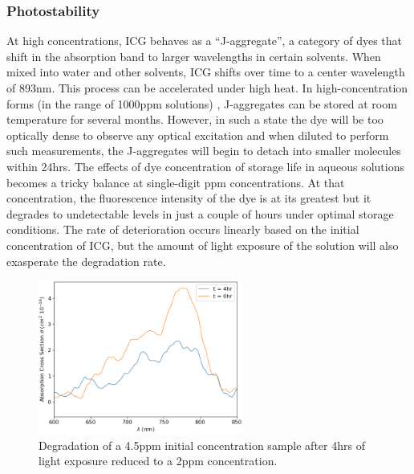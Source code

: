 \subsubsection{ Photostability}
At high concentrations, ICG behaves as a  ``J-aggregate'', a category of dyes that shift in the absorption band to larger wavelengths in certain solvents. When mixed into water and other solvents, ICG shifts over time to a center wavelength of 893nm. This process can be accelerated under high heat. In high-concentration forms (in the range of 1000ppm solutions) \cite{rotermund},  J-aggregates can be stored at room temperature for several months. However, in such a state the dye will be too optically dense to observe any optical excitation and when diluted to perform such measurements, the J-aggregates will begin to detach into smaller molecules within 24hrs.  The effects of dye concentration of storage life in aqueous solutions becomes a tricky balance at single-digit ppm concentrations. At that concentration, the fluorescence intensity of the dye is at its greatest but it degrades to undetectable levels in just a couple of hours under optimal storage conditions\cite{landsman, saxena}. The rate of deterioration occurs linearly based on the initial concentration of ICG\cite{holzer}, but the amount of light exposure of the solution will also exasperate the degradation rate\cite{saxena}.
\begin{figure}[h]
	\centering
	\includegraphics[width=0.6\textwidth]{./Figures/ICG/abc_time.png}
	\caption{Degradation of a 4.5ppm initial concentration sample after 4hrs of light exposure reduced to a 2ppm concentration.}
	\label{fig:icgphoto}
\end{figure}
\clearpage



